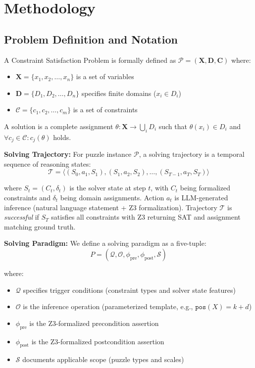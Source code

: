 
\section{Methodology}

\subsection{Problem Definition and Notation}

A Constraint Satisfaction Problem is formally defined as $\mathcal{P} = (\mathbf{X}, \mathbf{D}, \mathbf{C})$ where:
\begin{itemize}
    \item $\mathbf{X} = \{x_1, x_2, \ldots, x_n\}$ is a set of variables
    \item $\mathbf{D} = \{D_1, D_2, \ldots, D_n\}$ specifies finite domains ($x_i \in D_i$)
    \item $\mathcal{C} = \{c_1, c_2, \ldots, c_m\}$ is a set of constraints
\end{itemize}

A solution is a complete assignment $\theta: \mathbf{X} \to \bigcup_i D_i$ such that $\theta(x_i) \in D_i$ and $\forall c_j \in \mathcal{C}: c_j(\theta)$ holds.

\textbf{Solving Trajectory:} For puzzle instance $\mathcal{P}$, a solving trajectory is a temporal sequence of reasoning states:
$$\mathcal{T} = \langle (S_0, a_1, S_1), (S_1, a_2, S_2), \ldots, (S_{T-1}, a_T, S_T) \rangle$$

where $S_t = (C_t, \delta_t)$ is the solver state at step $t$, with $C_t$ being formalized constraints and $\delta_t$ being domain assignments. Action $a_t$ is LLM-generated inference (natural language statement + Z3 formalization). Trajectory $\mathcal{T}$ is \textit{successful} if $S_T$ satisfies all constraints with Z3 returning SAT and assignment matching ground truth.

\textbf{Solving Paradigm:} We define a solving paradigm as a five-tuple:
$$P = (\mathcal{Q}, \mathcal{O}, \phi_{\text{pre}}, \phi_{\text{post}}, \mathcal{S})$$

where:
\begin{itemize}
    \item $\mathcal{Q}$ specifies trigger conditions (constraint types and solver state features)
    \item $\mathcal{O}$ is the inference operation (parameterized template, e.g., $\texttt{pos}(X) = k + d$)
    \item $\phi_{\text{pre}}$ is the Z3-formalized precondition assertion
    \item $\phi_{\text{post}}$ is the Z3-formalized postcondition assertion
    \item $\mathcal{S}$ documents applicable scope (puzzle types and scales)
\end{itemize}

